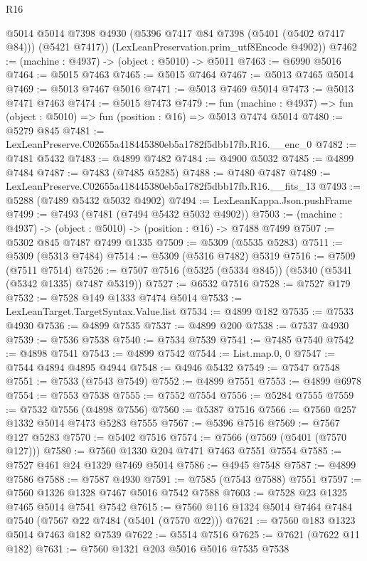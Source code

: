 \begin{lexlean}{R16}
\begin{coremodule}
        @5014
        @5014
        @7398
        @4930
        (@5396 @7417 @84 @7398 (@5401 (@5402 @7417 @84)))
        (@5421 @7417))
      (LexLeanPreservation.prim_utf8Encode @4902))
@7462 := (machine : @4937) -> (object : @5010) -> @5011
@7463 := @6990 @5016
@7464 := @5015 @7463
@7465 := @5015 @7464
@7467 := @5013 @7465 @5014
@7469 := @5013 @7467 @5016
@7471 := @5013 @7469 @5014
@7473 := @5013 @7471 @7463
@7474 := @5015 @7473
@7479 := fun (machine : @4937) => fun (object : @5010) => fun (position : @16) => @5013 @7474 @5014
@7480 := @5279 @845
@7481 := LexLeanPreserve.C02655a418445380eb5a1782f5dbb17fb.R16.__enc_0
@7482 := @7481 @5432
@7483 := @4899 @7482
@7484 := @4900 @5032
@7485 := @4899 @7484
@7487 := @7483 (@7485 @5285)
@7488 := @7480 @7487
@7489 := LexLeanPreserve.C02655a418445380eb5a1782f5dbb17fb.R16.__fits_13
@7493 := @5288 (@7489 @5432 @5032 @4902)
@7494 := LexLeanKappa.Json.pushFrame
@7499 := @7493 (@7481 (@7494 @5432 @5032 @4902))
@7503 := (machine : @4937) -> (object : @5010) -> (position : @16) -> @7488 @7499
@7507 := @5302 @845 @7487 @7499 @1335
@7509 := @5309 (@5535 @5283)
@7511 := @5309 (@5313 @7484)
@7514 := @5309 (@5316 @7482) @5319
@7516 := @7509 (@7511 @7514)
@7526 := @7507 @7516 (@5325 (@5334 @845)) (@5340 (@5341 (@5342 @1335) @7487 @5319))
@7527 := @6532 @7516
@7528 := @7527 @179
@7532 := @7528 @149 @1333 @7474 @5014
@7533 := LexLeanTarget.TargetSyntax.Value.list
@7534 := @4899 @182
@7535 := @7533 @4930
@7536 := @4899 @7535
@7537 := @4899 @200
@7538 := @7537 @4930
@7539 := @7536 @7538
@7540 := @7534 @7539
@7541 := @7485 @7540
@7542 := @4898 @7541
@7543 := @4899 @7542
@7544 := List.map.{0, 0}
@7547 := @7544 @4894 @4895 @4944
@7548 := @4946 @5432
@7549 := @7547 @7548
@7551 := @7533 (@7543 @7549)
@7552 := @4899 @7551
@7553 := @4899 @6978
@7554 := @7553 @7538
@7555 := @7552 @7554
@7556 := @5284 @7555
@7559 := @7532 @7556 (@4898 @7556)
@7560 := @5387 @7516
@7566 := @7560 @257 @1332 @5014 @7473 @5283 @7555
@7567 := @5396 @7516
@7569 := @7567 @127 @5283
@7570 := @5402 @7516
@7574 := @7566 (@7569 (@5401 (@7570 @127)))
@7580 := @7560 @1330 @204 @7471 @7463 @7551 @7554
@7585 := @7527 @461 @24 @1329 @7469 @5014
@7586 := @4945 @7548
@7587 := @4899 @7586
@7588 := @7587 @4930
@7591 := @7585 (@7543 @7588) @7551
@7597 := @7560 @1326 @1328 @7467 @5016 @7542 @7588
@7603 := @7528 @23 @1325 @7465 @5014 @7541 @7542
@7615 := @7560 @116 @1324 @5014 @7464 @7484 @7540 (@7567 @22 @7484 (@5401 (@7570 @22)))
@7621 := @7560 @183 @1323 @5014 @7463 @182 @7539
@7622 := @5514 @7516
@7625 := @7621 (@7622 @11 @182)
@7631 := @7560 @1321 @203 @5016 @5016 @7535 @7538

\end{coremodule}
\end{lexlean}
